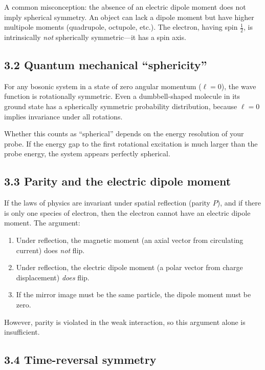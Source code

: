 \documentclass[12pt,a4paper]{article}
\begin{document}
A common misconception: the absence of an electric dipole moment does not imply spherical symmetry.  An object can lack a dipole moment but have higher multipole moments (quadrupole, octupole, etc.).  The electron, having spin $\frac{1}{2}$, is intrinsically \emph{not} spherically symmetric---it has a spin axis.

\subsection{3.2 Quantum mechanical ``sphericity''}

For any bosonic system in a state of zero angular momentum ($\ell = 0$), the wave function is rotationally symmetric.  Even a dumbbell-shaped molecule in its ground state has a spherically symmetric probability distribution, because $\ell = 0$ implies invariance under all rotations.

Whether this counts as ``spherical'' depends on the energy resolution of your probe.  If the energy gap to the first rotational excitation is much larger than the probe energy, the system appears perfectly spherical.

\subsection{3.3 Parity and the electric dipole moment}

If the laws of physics are invariant under spatial reflection (parity $P$), and if there is only one species of electron, then the electron cannot have an electric dipole moment.  The argument:
\begin{enumerate}[nosep]
    \item Under reflection, the magnetic moment (an axial vector from circulating current) does \emph{not} flip.
    \item Under reflection, the electric dipole moment (a polar vector from charge displacement) \emph{does} flip.
    \item If the mirror image must be the same particle, the dipole moment must be zero.
\end{enumerate}
However, parity is violated in the weak interaction, so this argument alone is insufficient.

\subsection{3.4 Time-reversal symmetry}
\end{document}
